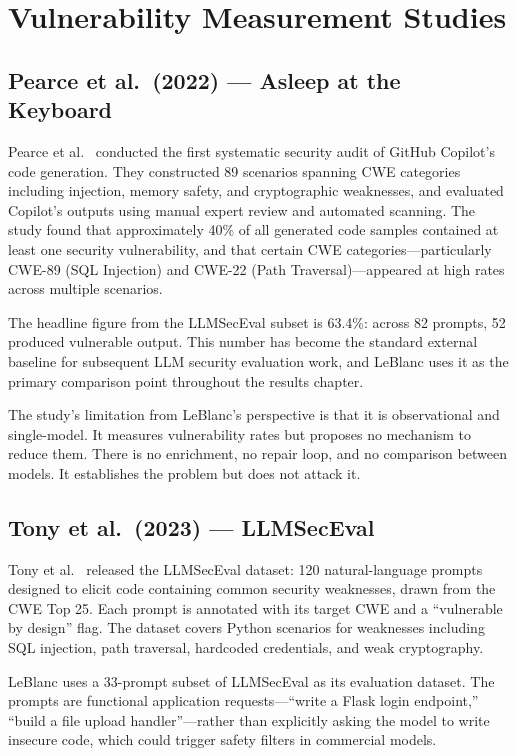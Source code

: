 \documentclass[12pt,a4paper]{report}
\begin{document}
\section{Vulnerability Measurement Studies}
\label{sec:litbaseline}

\subsection{Pearce et al.\ (2022) --- Asleep at the Keyboard}
\label{ssec:pearce}

Pearce et al.~\cite{pearce2022asleep} conducted the first systematic security
audit of GitHub Copilot's code generation. They constructed 89 scenarios spanning
CWE categories including injection, memory safety, and cryptographic weaknesses,
and evaluated Copilot's outputs using manual expert review and automated scanning.
The study found that approximately 40\% of all generated code samples contained at
least one security vulnerability, and that certain CWE categories---particularly
CWE-89 (SQL Injection) and CWE-22 (Path Traversal)---appeared at high rates
across multiple scenarios.

The headline figure from the LLMSecEval subset is 63.4\%: across 82 prompts,
52 produced vulnerable output. This number has become the standard external
baseline for subsequent LLM security evaluation work, and LeBlanc uses it as the
primary comparison point throughout the results chapter.

The study's limitation from LeBlanc's perspective is that it is observational
and single-model. It measures vulnerability rates but proposes no mechanism to
reduce them. There is no enrichment, no repair loop, and no comparison between
models. It establishes the problem but does not attack it.

\subsection{Tony et al.\ (2023) --- LLMSecEval}
\label{ssec:tony}

Tony et al.~\cite{tony2023llmseceval} released the LLMSecEval dataset: 120
natural-language prompts designed to elicit code containing common security
weaknesses, drawn from the CWE Top 25. Each prompt is annotated with its target
CWE and a ``vulnerable by design'' flag. The dataset covers Python scenarios for
weaknesses including SQL injection, path traversal, hardcoded credentials, and
weak cryptography.

LeBlanc uses a 33-prompt subset of LLMSecEval as its evaluation dataset. The
prompts are functional application requests---``write a Flask login endpoint,''
``build a file upload handler''---rather than explicitly asking the model to write
insecure code, which could trigger safety filters in commercial models.
\end{document}
